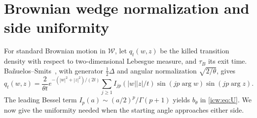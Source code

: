 \documentclass[11pt,letterpaper]{article}
\theoremstyle{remark}\newtheorem{remark}[theorem]{Remark}
\newcommand{\1}{\mathbf1}
\newcommand{\Wedge}{\mathcal W}
\begin{document}
\section{Brownian wedge normalization and side uniformity}\label{icw:sec:brownian}
For standard Brownian motion in $\Wedge$, let $q_t(w,z)$ be the killed
transition density with respect to two-dimensional Lebesgue measure,
and $\tau_B$ its exit time. Bañuelos--Smits~\cite[Lemma 1,
equation (2.2)]{banuelos}, with generator $\tfrac12\Delta$ and angular
normalization $\sqrt{2/\theta}$, gives
\begin{equation}\label{icw:eq:brownian-kernel}
 q_t(w,z)=\frac2{\theta t}e^{-(|w|^2+|z|^2)/(2t)}
 \sum_{j\ge1}I_{jp}(|w||z|/t)
 \sin(jp\arg w)\sin(jp\arg z).
\end{equation}
The leading Bessel term $I_p(a)\sim(a/2)^p/\Gamma(p+1)$ yields
$b_\theta$ in \eqref{icw:eq:U}. We now give the uniformity needed when the
starting angle approaches either side.
\end{document}
